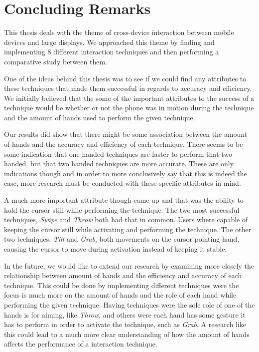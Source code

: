 \section*{Concluding Remarks} \label{sec:conclusion}

This thesis deals with the theme of cross-device interaction between mobile devices and large displays. 
We approached this theme by finding and implementing 8 different interaction techniques and then performing a comparative study between them.

One of the ideas behind this thesis was to see if we could find any attributes to these techniques that made them successful in regards to accuracy and efficiency.
We initially believed that the some of the important attributes to the success of a technique would be whether or not the phone was in motion during the technique and the amount of hands used to perform the given technique.

Our results did show that there might be some association between the amount of hands and the accuracy and efficiency of each technique. 
There seems to be some indication that one handed techniques are faster to perform that two handed, but that two handed techniques are more accurate.
These are only indications though and in order to more conclusively say that this is indeed the case, more research must be conducted with these specific attributes in mind.  

A much more important attribute though came up and that was the ability to hold the cursor still while performing the technique. 
The two most successful techniques, \emph{Swipe} and \emph{Throw} both had that in common. 
Users where capable of keeping the cursor still while activating and performing the technique.
The other two techniques, \emph{Tilt} and \emph{Grab}, both movements on the cursor pointing hand, causing the cursor to move during activation instead of keeping it stable. 

In the future, we would like to extend our research by examining more closely the relationship between amount of hands and the efficiency and accuracy of each technique. 
This could be done by implementing different techniques were the focus is much more on the amount of hands and the role of each hand while performing the given technique.
Having techniques were the sole role of one of the hands is for aiming, like \emph{Throw}, and others were each hand has some gesture it has to perform in order to activate the technique, such as \emph{Grab}.
A research like this could lead to a much more clear understanding of how the amount of hands affects the performance of a interaction technique.